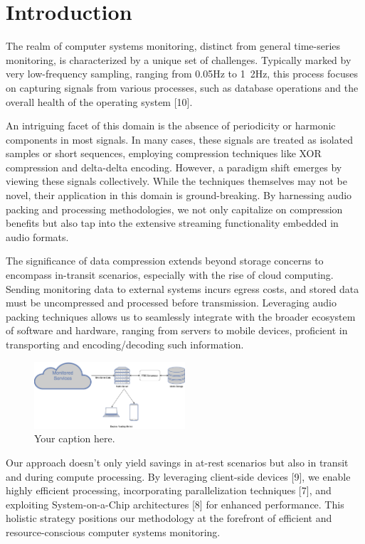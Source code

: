 \documentclass[conference]{IEEEtran}
\begin{document}
\section{Introduction}
The realm of computer systems monitoring, distinct from general time-series monitoring, is characterized by a unique set of challenges. Typically marked by very low-frequency sampling, ranging from 0.05Hz to 1~2Hz, this process focuses on capturing signals from various processes, such as database operations and the overall health of the operating system [10]. 
 
An intriguing facet of this domain is the absence of periodicity or harmonic components in most signals. In many cases, these signals are treated as isolated samples or short sequences, employing compression techniques like XOR compression and delta-delta encoding. 
However, a paradigm shift emerges by viewing these signals collectively. While the techniques themselves may not be novel, their application in this domain is ground-breaking. By harnessing audio packing and processing methodologies, we not only capitalize on compression benefits but also tap into the extensive streaming functionality embedded in audio formats. 
 
The significance of data compression extends beyond storage concerns to encompass in-transit scenarios, especially with the rise of cloud computing. Sending monitoring data to external systems incurs egress costs, and stored data must be uncompressed and processed before transmission. Leveraging audio packing techniques allows us to seamlessly integrate with the broader ecosystem of software and hardware, ranging from servers to mobile devices, proficient in transporting and encoding/decoding such information. 

\begin{figure}[h]
  \centering
  \includegraphics[width=0.5\textwidth]{Fig1.png}
  \caption{Your caption here.}
  \label{Fig.1}
\end{figure}

Our approach doesn't only yield savings in at-rest scenarios but also in transit and during compute processing. By leveraging client-side devices [9], we enable highly efficient processing, incorporating parallelization techniques [7], and exploiting System-on-a-Chip architectures [8] for enhanced performance. This holistic strategy positions our methodology at the forefront of efficient and resource-conscious computer systems monitoring. 
\end{document}
